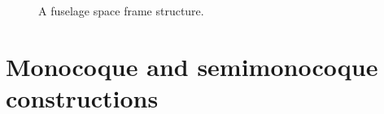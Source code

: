 \documentclass{AeroStructure-ERJohnson}
\begin{document}
\newpage

{\def\thefigure{1.1}
\begin{figure}
\caption{A fuselage space frame structure.\label{fig1.1}}\vspace*{-20pt}
\end{figure}
}
{\def\thefigure{1.2}
}

\vspace*{-1\baselineskip}

\section{Monocoque and semimonocoque constructions}
\end{document}
